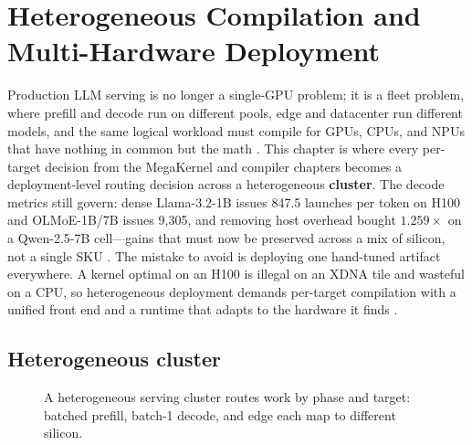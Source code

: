 \chapter{Heterogeneous Compilation and Multi-Hardware Deployment}
\label{chap:ch24}

Production LLM serving is no longer a single-GPU problem; it is a fleet problem, where prefill and decode run on different pools, edge and datacenter run different models, and the same logical workload must compile for GPUs, CPUs, and NPUs that have nothing in common but the math \citep{patel2025llminference,iree2024}. This chapter is where every per-target decision from the MegaKernel and compiler chapters becomes a deployment-level routing decision across a heterogeneous \textbf{cluster}. The decode metrics still govern: dense Llama-3.2-1B issues 847.5 launches per token on H100 and OLMoE-1B/7B issues 9{,}305, and removing host overhead bought $1.259\times$ on a Qwen-2.5-7B cell---gains that must now be preserved across a mix of silicon, not a single SKU \citep{taxbreak2026,memoryfloor2026,nvidia2024cudagraphs}.
The mistake to avoid is deploying one hand-tuned artifact everywhere. A kernel optimal on an H100 is illegal on an XDNA tile and wasteful on a CPU, so heterogeneous deployment demands per-target compilation with a unified front end and a runtime that adapts to the hardware it finds \citep{amd2024xdna,rotem2018glow}.

\section{Heterogeneous cluster}
\label{sec:ch24_hetero_cluster}


\begin{figure}[t]
\centering
{}
\caption{A heterogeneous serving cluster routes work by phase and target: batched prefill, batch-1 decode, and edge each map to different silicon.}
\label{fig:hetero_cluster_pipeline}
\end{figure}

